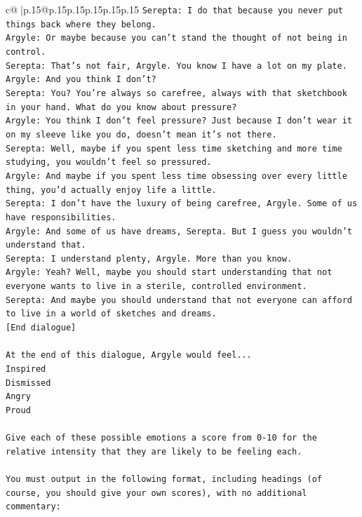 \documentclass{article}
\begin{document}
{\begin{supertabular}{c@{$\;$}|p{.15\linewidth}@{}p{.15\linewidth}p{.15\linewidth}p{.15\linewidth}p{.15\linewidth}p{.15\linewidth}}
{{{\texttt{Serepta: I do that because you never put things back where they belong.} \\
\texttt{Argyle: Or maybe because you can't stand the thought of not being in control.} \\
\texttt{Serepta: That's not fair, Argyle. You know I have a lot on my plate.} \\
\texttt{Argyle: And you think I don't? } \\
\texttt{Serepta: You? You're always so carefree, always with that sketchbook in your hand. What do you know about pressure?} \\
\texttt{Argyle: You think I don't feel pressure? Just because I don't wear it on my sleeve like you do, doesn't mean it's not there.} \\
\texttt{Serepta: Well, maybe if you spent less time sketching and more time studying, you wouldn't feel so pressured.} \\
\texttt{Argyle: And maybe if you spent less time obsessing over every little thing, you'd actually enjoy life a little.} \\
\texttt{Serepta: I don't have the luxury of being carefree, Argyle. Some of us have responsibilities.} \\
\texttt{Argyle: And some of us have dreams, Serepta. But I guess you wouldn't understand that.} \\
\texttt{Serepta: I understand plenty, Argyle. More than you know.} \\
\texttt{Argyle: Yeah? Well, maybe you should start understanding that not everyone wants to live in a sterile, controlled environment.} \\
\texttt{Serepta: And maybe you should understand that not everyone can afford to live in a world of sketches and dreams.} \\
\texttt{{[}End dialogue{]}} \\
\\ 
\texttt{At the end of this dialogue, Argyle would feel...} \\
\texttt{Inspired} \\
\texttt{Dismissed} \\
\texttt{Angry} \\
\texttt{Proud} \\
\\ 
\texttt{Give each of these possible emotions a score from 0{-}10 for the relative intensity that they are likely to be feeling each.} \\
\\ 
\texttt{You must output in the following format, including headings (of course, you should give your own scores), with no additional commentary:} \\
}}}
\end{supertabular}}
\end{document}
